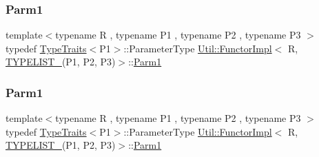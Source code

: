 \subsubsection{\texorpdfstring{Parm1}{Parm1}\hspace{0.1cm}{\footnotesize\ttfamily [1/3]}}
{\footnotesize\ttfamily template$<$typename R , typename P1 , typename P2 , typename P3 $>$ \\
typedef \mbox{\hyperlink{classUtil_1_1TypeTraits}{Type\+Traits}}$<$P1$>$\+::Parameter\+Type \mbox{\hyperlink{classUtil_1_1FunctorImpl}{Util\+::\+Functor\+Impl}}$<$ R, \mbox{\hyperlink{adat__devel__install_2include_2adat_2typelist_8h_a0309f68a543c5c0994f9edc0e56dc59f}{T\+Y\+P\+E\+L\+I\+S\+T\+\_}}(P1, P2, P3)$>$\+::\mbox{\hyperlink{structUtil_1_1Private_1_1FunctorImplBase_a9d61e693d6c616dea5bd9d9073c7d21a}{Parm1}}}

\mbox{\label{classUtil_1_1FunctorImpl_3_01R_00_01TYPELIST__3_07P1_00_01P2_00_01P3_08_4_af62467f5d0a091d03f5db9c7fbeb1f96}} 
\subsubsection{\texorpdfstring{Parm1}{Parm1}\hspace{0.1cm}{\footnotesize\ttfamily [2/3]}}
{\footnotesize\ttfamily template$<$typename R , typename P1 , typename P2 , typename P3 $>$ \\
typedef \mbox{\hyperlink{classUtil_1_1TypeTraits}{Type\+Traits}}$<$P1$>$\+::Parameter\+Type \mbox{\hyperlink{classUtil_1_1FunctorImpl}{Util\+::\+Functor\+Impl}}$<$ R, \mbox{\hyperlink{adat__devel__install_2include_2adat_2typelist_8h_a0309f68a543c5c0994f9edc0e56dc59f}{T\+Y\+P\+E\+L\+I\+S\+T\+\_}}(P1, P2, P3)$>$\+::\mbox{\hyperlink{structUtil_1_1Private_1_1FunctorImplBase_a9d61e693d6c616dea5bd9d9073c7d21a}{Parm1}}}

\mbox{\label{classUtil_1_1FunctorImpl_3_01R_00_01TYPELIST__3_07P1_00_01P2_00_01P3_08_4_af62467f5d0a091d03f5db9c7fbeb1f96}} 
